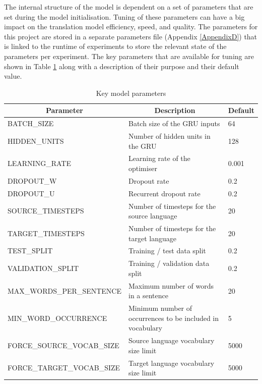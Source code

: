 The internal structure of the model is dependent on a set of parameters that are set during the model initialisation. 
Tuning of these parameters can have a big impact on the translation model efficiency, speed, and quality. The parameters for this project are stored in a separate parameters file (Appendix \ref{AppendixD}) that is linked to the runtime of experiments to store the relevant state of the parameters per experiment. The key parameters that are available for tuning are shown in Table \ref{tab:model-parameters} along with a description of their purpose and their default value.


\begin{table}[!ht]
\centering
\small
\begin{tabular}{|l|p{6.6cm}|l|}
\hline
\multicolumn{1}{|c|}{\textbf{Parameter}} & \multicolumn{1}{c|}{\textbf{Description}}                                       & \textbf{Default} \\ \hline
BATCH\_SIZE                & Batch size of the \acrshort{GRU} inputs            & 64    \\ \hline
HIDDEN\_UNITS              & Number of hidden units in the \acrshort{GRU}       & 128   \\ \hline
LEARNING\_RATE             & Learning rate of the optimiser                     & 0.001 \\ \hline
DROPOUT\_W                 & Dropout rate                                       & 0.2   \\ \hline
DROPOUT\_U                 & Recurrent dropout rate                             & 0.2   \\ \hline
SOURCE\_TIMESTEPS          & Number of timesteps for the source language        & 20    \\ \hline
TARGET\_TIMESTEPS          & Number of timesteps for the target language        & 20    \\ \hline
TEST\_SPLIT                & Training / test data split                         & 0.2   \\ \hline
VALIDATION\_SPLIT          & Training / validation data split                   & 0.2   \\ \hline
MAX\_WORDS\_PER\_SENTENCE  & Maximum number of words in a sentence              & 20    \\ \hline
MIN\_WORD\_OCCURRENCE      & Minimum number of occurrences to be included in vocabulary & 5 \\ \hline
FORCE\_SOURCE\_VOCAB\_SIZE & Source language vocabulary size limit              & 5000 \\ \hline
FORCE\_TARGET\_VOCAB\_SIZE & Target language vocabulary size limit              & 5000 \\ \hline
\end{tabular}
\captionsetup{justification=centering}
\caption{Key model parameters}
\label{tab:model-parameters}
\end{table}


